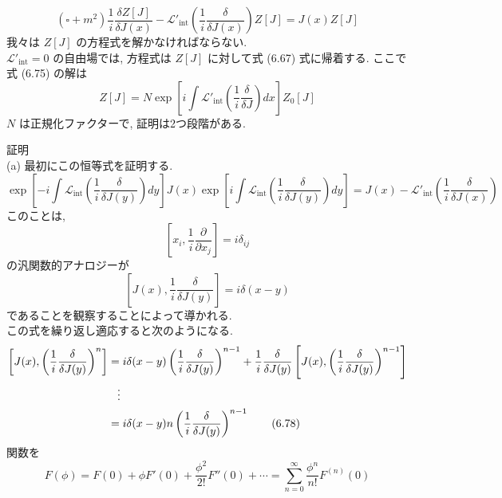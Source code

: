 \documentclass{jsarticle}
\begin{document}
\begin{equation*}
    (\square + m^2)\frac{1}{i}\frac{\delta Z[J]}{\delta J(x)} - \mathcal{L}'_{\textrm{int}}\left( \frac{1}{i}\frac{\delta}{\delta J(x)} \right)Z[J] = J(x)Z[J] \tag{6.75}
\end{equation*}
我々は $Z[J]$ の方程式を解かなければならない.\\
$\mathcal{L}'_{\textrm{int}} = 0$ の自由場では, 方程式は $Z[J]$ に対して式 (6.67) 式に帰着する. ここで式 (6.75) の解は
\begin{equation*}
    Z[J] = N \exp\left[ i\int \mathcal{L}'_{\textrm{int}}\left( \frac{1}{i}\frac{\delta}{\delta J} \right)dx \right]Z_0[J] \tag{6.76}
\end{equation*}
$N$ は正規化ファクターで, 証明は2つ段階がある.\par
証明\\
(a) 最初にこの恒等式を証明する.
\begin{equation*}
    \exp\left[ -i\int \mathcal{L}_{\textrm{int}} \left( \frac{1}{i}\frac{\delta}{\delta J(y)} \right)dy \right]J(x) \exp\left[ i\int \mathcal{L}_{\textrm{int}} \left( \frac{1}{i}\frac{\delta}{\delta J(y)} \right)dy \right] = J(x) - \mathcal{L}'_{\textrm{int}}\left( \frac{1}{i}\frac{\delta}{\delta J(x)} \right) \tag{6.77}
\end{equation*}
このことは,
\begin{equation*}
    \left[ x_i, \frac{1}{i}\frac{\partial}{\partial x_j} \right] = i\delta_{ij}
\end{equation*}
の汎関数的アナロジーが
\begin{equation*}
    \left[ J(x), \frac{1}{i}\frac{\delta}{\delta J(y)} \right] = i\delta (x-y)
\end{equation*}
であることを観察することによって導かれる.\\
この式を繰り返し適応すると次のようになる.
\begin{align*}
    \left[ J(x), \left( \frac{1}{i}\frac{\delta}{\delta J(y)} \right)^n \right] &= i\delta(x-y)\left( \frac{1}{i}\frac{\delta}{\delta J(y)} \right)^{n-1} + \frac{1}{i}\frac{\delta}{\delta J(y)}\left[ J(x), \left( \frac{1}{i}\frac{\delta}{\delta J(y)} \right)^{n-1} \right]\\
    &\hspace{0.3cm}\vdots\\
    &=  i\delta(x-y)n\left( \frac{1}{i}\frac{\delta}{\delta J(y)} \right)^{n-1} \tag{6.78}
\end{align*}
関数を
\begin{equation*}
    F(\phi) = F(0) + \phi F'(0) + \frac{\phi^2}{2!}F''(0) + \cdots = \sum_{n=0}^{\infty}\frac{\phi^n}{n!}F^{(n)}(0)
\end{equation*}
\end{document}

